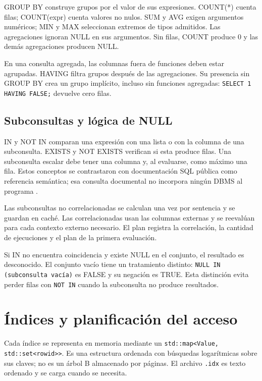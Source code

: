 \documentclass[11pt,a4paper]{article}
\begin{document}
GROUP BY construye grupos por el valor de sus expresiones. COUNT(*) cuenta
filas; COUNT(expr) cuenta valores no nulos. SUM y AVG exigen argumentos
numéricos; MIN y MAX seleccionan extremos de tipos admitidos. Las
agregaciones ignoran NULL en sus argumentos. Sin filas, COUNT produce 0
y las demás agregaciones producen NULL.

En una consulta agregada, las columnas fuera de funciones deben estar
agrupadas. HAVING filtra grupos después de las agregaciones. Su presencia
sin GROUP BY crea un grupo implícito, incluso sin funciones agregadas:
\texttt{SELECT 1 HAVING FALSE;} devuelve cero filas.

\subsection{Subconsultas y lógica de NULL}

IN y NOT IN comparan una expresión con una lista o con la columna de una
subconsulta. EXISTS y NOT EXISTS verifican si esta produce filas. Una
subconsulta escalar debe tener una columna y, al evaluarse, como máximo
una fila. Estos conceptos se contrastaron con documentación SQL pública
como referencia semántica; esa consulta documental no incorpora ningún
DBMS al programa \cite{subconsultas}.

Las subconsultas no correlacionadas se calculan una vez por sentencia y
se guardan en caché. Las correlacionadas usan las columnas externas y se
reevalúan para cada contexto externo necesario. El plan registra la
correlación, la cantidad de ejecuciones y el plan de la primera evaluación.

Si IN no encuentra coincidencia y existe NULL en el conjunto, el resultado
es desconocido. El conjunto vacío tiene un tratamiento distinto:
\texttt{NULL IN (subconsulta vacía)} es FALSE y su negación es TRUE.
Esta distinción evita perder filas con \texttt{NOT IN} cuando la
subconsulta no produce resultados.

\section{Índices y planificación del acceso}

Cada índice se representa en memoria mediante un
\texttt{std::map<Value, std::set<rowid>>}. Es una estructura ordenada con
búsquedas logarítmicas sobre sus claves; no es un árbol B almacenado por
páginas. El archivo \texttt{.idx} es texto ordenado y se carga cuando
se necesita.
\end{document}
